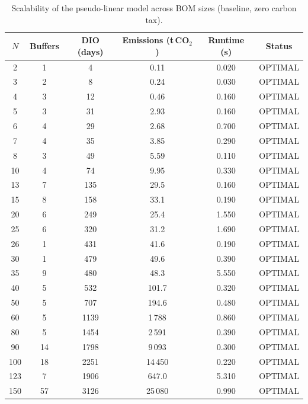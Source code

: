 \begin{table}[!htbp]\centering
\caption{Scalability of the pseudo-linear model across BOM sizes (baseline, zero carbon tax).}\label{tab:scal}
\begin{tabular}{cccccc}
\toprule
$N$ & Buffers & DIO (days) & Emissions (t\,CO$_2$) & Runtime (s) & Status\\
\midrule
2 & 1 & 4 & 0.11 & 0.020 & OPTIMAL \\
3 & 2 & 8 & 0.24 & 0.030 & OPTIMAL \\
4 & 3 & 12 & 0.46 & 0.160 & OPTIMAL \\
5 & 3 & 31 & 2.93 & 0.160 & OPTIMAL \\
6 & 4 & 29 & 2.68 & 0.700 & OPTIMAL \\
7 & 4 & 35 & 3.85 & 0.290 & OPTIMAL \\
8 & 3 & 49 & 5.59 & 0.110 & OPTIMAL \\
10 & 4 & 74 & 9.95 & 0.330 & OPTIMAL \\
13 & 7 & 135 & 29.5 & 0.160 & OPTIMAL \\
15 & 8 & 158 & 33.1 & 0.190 & OPTIMAL \\
20 & 6 & 249 & 25.4 & 1.550 & OPTIMAL \\
25 & 6 & 320 & 31.2 & 1.690 & OPTIMAL \\
26 & 1 & 431 & 41.6 & 0.190 & OPTIMAL \\
30 & 1 & 479 & 49.6 & 0.390 & OPTIMAL \\
35 & 9 & 480 & 48.3 & 5.550 & OPTIMAL \\
40 & 5 & 532 & 101.7 & 0.320 & OPTIMAL \\
50 & 5 & 707 & 194.6 & 0.480 & OPTIMAL \\
60 & 5 & 1139 & 1\,788 & 0.860 & OPTIMAL \\
80 & 5 & 1454 & 2\,591 & 0.390 & OPTIMAL \\
90 & 14 & 1798 & 9\,093 & 0.300 & OPTIMAL \\
100 & 18 & 2251 & 14\,450 & 0.220 & OPTIMAL \\
123 & 7 & 1906 & 647.0 & 5.310 & OPTIMAL \\
150 & 57 & 3126 & 25\,080 & 0.990 & OPTIMAL \\
\bottomrule
\end{tabular}
\end{table}

